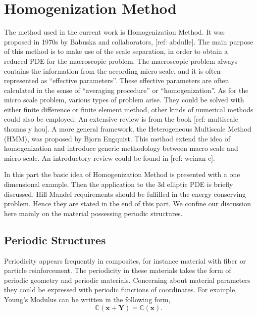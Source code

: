 %
%
%
%
%
%

\chapter{Homogenization Method}
The method used in the current work is Homogenization Method. It was proposed in 1970s by Babuska and collaborators, [ref: abdulle]. The main purpose of this method is to make use of the scale separation, in order to obtain a reduced PDE for the macroscopic problem. The macroscopic problem always contains the information from the according micro scale, and it is often represented as ``effective parameters''. These effective parameters are often calculated in the sense of ``averaging procedure'' or ``homogenization''. As for the micro scale problem, various types of problem arise. They could be solved with either finite difference or finite element method, other kinds of numerical methods could also be employed. An extensive review is from the book [ref: multiscale thomas y hou]. A more general framework, the Heterogeneous Multiscale Method (HMM), was proposed by Bjorn Engquist. This method extend the idea of homogenization and introduce generic methodology between macro scale and micro scale. An introductory review could be found in [ref: weinan e].

In this part the basic idea of Homogenization Method is presented with a one dimensional example. Then the application to the 3d elliptic PDE is briefly discussed. Hill Mandel requirements should be fulfilled in the energy conserving problem. Hence they are stated in the end of this part. We confine our discussion here mainly on the material possessing periodic structures. 

\section{Periodic Structures}
Periodicity appears frequently in composites, for instance material with fiber or particle reinforcement. The periodicity in these materials takes the form of periodic geometry and periodic materials. Concerning about material parameters they could be expressed with periodic functions of coordinates. For example, Young's Modulus can be written in the following form,
%
\begin{equation}
\label{eq:periodic 1}
\mathbb{C}(\mathbf{x}+\mathbf{Y}) = \mathbb{C}(\mathbf{x}).
\end{equation}
%

